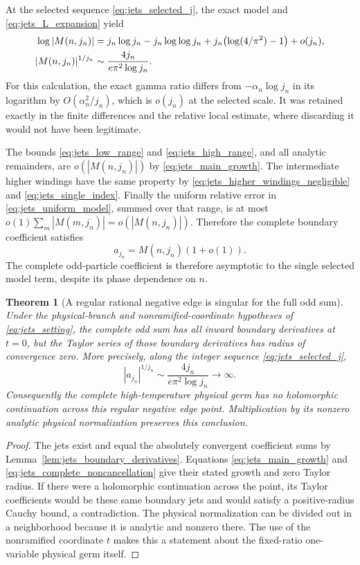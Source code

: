 \documentclass[11pt]{article}
\numberwithin{equation}{section}
\newtheorem{theorem}{Theorem}[section]
\theoremstyle{definition}
\begin{document}
At the selected sequence \eqref{eq:jets_selected_j}, the exact
model and \eqref{eq:jets_L_expansion} yield
\begin{align}
 \log|M(n,j_n)|
 &=j_n\log j_n-j_n\log\log j_n
   +j_n\bigl(\log(4/\pi^2)-1\bigr)+o(j_n),
 \label{eq:jets_main_growth}\\
 |M(n,j_n)|^{1/j_n}
 &\sim\frac{4j_n}{e\pi^2\log j_n}.
 \notag
\end{align}
For this calculation, the exact gamma ratio differs from
$-\alpha_n\log j_n$ in its logarithm by $O(\alpha_n^2/j_n)$,
which is $o(j_n)$ at the selected scale. It was retained exactly
in the finite differences and the relative local estimate, where
discarding it would not have been legitimate.

The bounds \eqref{eq:jets_low_range} and
\eqref{eq:jets_high_range}, and all analytic remainders, are
$o(|M(n,j_n)|)$ by \eqref{eq:jets_main_growth}. The intermediate
higher windings have the same property by
\eqref{eq:jets_higher_windings_negligible} and
\eqref{eq:jets_single_index}. Finally the uniform relative error
in \eqref{eq:jets_uniform_model}, summed over that range, is at
most $o(1)\sum_m|M(m,j_n)|=o(|M(n,j_n)|)$. Therefore the
complete boundary coefficient satisfies
\begin{equation}\label{eq:jets_complete_noncancellation}
 a_{j_n}=M(n,j_n)(1+o(1)).
\end{equation}
The complete odd-particle coefficient is therefore asymptotic to the
single selected model term, despite its phase dependence on $n$.

\begin{theorem}[A regular rational negative edge is singular for the full odd sum]
\label{thm:jets_negative_edge}
Under the physical-branch and nonramified-coordinate hypotheses
of \eqref{eq:jets_setting}, the complete odd sum has all inward
boundary derivatives at $t=0$, but the Taylor series of those
boundary derivatives has radius of convergence zero. More
precisely, along the integer sequence \eqref{eq:jets_selected_j},
\[
 |a_{j_n}|^{1/j_n}\sim\frac{4j_n}{e\pi^2\log j_n}\longrightarrow\infty.
\]
Consequently the complete high-temperature physical germ has no
holomorphic continuation across this regular negative edge
point. Multiplication by its nonzero analytic physical
normalization preserves this conclusion.
\end{theorem}

\begin{proof}
The jets exist and equal the absolutely convergent coefficient
sums by Lemma~\ref{lem:jets_boundary_derivatives}. Equations
\eqref{eq:jets_main_growth} and
\eqref{eq:jets_complete_noncancellation} give their stated
growth and zero Taylor radius. If there were a holomorphic
continuation across the point, its Taylor coefficients would be
these same boundary jets and would satisfy a positive-radius
Cauchy bound, a contradiction. The physical normalization can
be divided out in a neighborhood because it is analytic and
nonzero there. The use of the nonramified coordinate $t$ makes
this a statement about the fixed-ratio one-variable physical
germ itself.
\end{proof}
\end{document}

